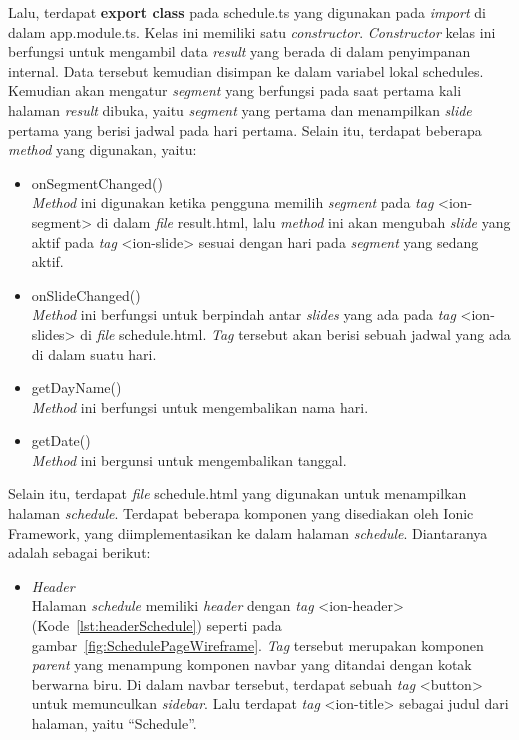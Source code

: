 \begin{itemize}
	Lalu, terdapat \textbf{export class} pada schedule.ts yang digunakan pada \textit{import} di dalam app.module.ts. Kelas ini memiliki satu \textit{constructor}. \textit{Constructor} kelas ini berfungsi untuk mengambil data \textit{result} yang berada di dalam penyimpanan internal. Data tersebut kemudian disimpan ke dalam variabel lokal schedules. Kemudian akan mengatur \textit{segment} yang berfungsi pada saat pertama kali halaman \textit{result} dibuka, yaitu \textit{segment} yang pertama dan menampilkan \textit{slide} pertama yang berisi jadwal pada hari pertama. Selain itu, terdapat beberapa \textit{method} yang digunakan, yaitu:
	
	\begin{itemize}
		\item onSegmentChanged() \\
		\textit{Method} ini digunakan ketika pengguna memilih \textit{segment} pada \textit{tag} <ion-segment> di dalam \textit{file} result.html, lalu \textit{method} ini akan mengubah \textit{slide} yang aktif pada \textit{tag} <ion-slide> sesuai dengan hari pada \textit{segment} yang sedang aktif. 
		\item onSlideChanged() \\
		\textit{Method} ini berfungsi untuk berpindah antar \textit{slides} yang ada pada \textit{tag} <ion-slides> di \textit{file} schedule.html. \textit{Tag} tersebut akan berisi sebuah jadwal yang ada di dalam suatu hari.
		\item getDayName() \\
		\textit{Method} ini berfungsi untuk mengembalikan nama hari.
		\item getDate() \\
		\textit{Method} ini bergunsi untuk mengembalikan tanggal.
	\end{itemize}
	
	Selain itu, terdapat \textit{file} schedule.html yang digunakan untuk menampilkan halaman \textit{schedule}. Terdapat beberapa komponen yang disediakan oleh Ionic Framework, yang diimplementasikan ke dalam halaman \textit{schedule}. Diantaranya adalah sebagai berikut:
	
	\begin{itemize}
		\item \textit{Header} \\
		Halaman \textit{schedule} memiliki \textit{header} dengan \textit{tag} <ion-header> (Kode~\ref{lst:headerSchedule}) seperti pada gambar~\ref{fig:SchedulePageWireframe}. \textit{Tag} tersebut merupakan komponen \textit{parent} yang menampung komponen navbar yang ditandai dengan kotak berwarna biru. Di dalam navbar tersebut, terdapat sebuah \textit{tag} <button> untuk memunculkan \textit{sidebar}. Lalu terdapat \textit{tag} <ion-title> sebagai judul dari halaman, yaitu ``Schedule''.
		

\end{itemize}
\end{itemize}
